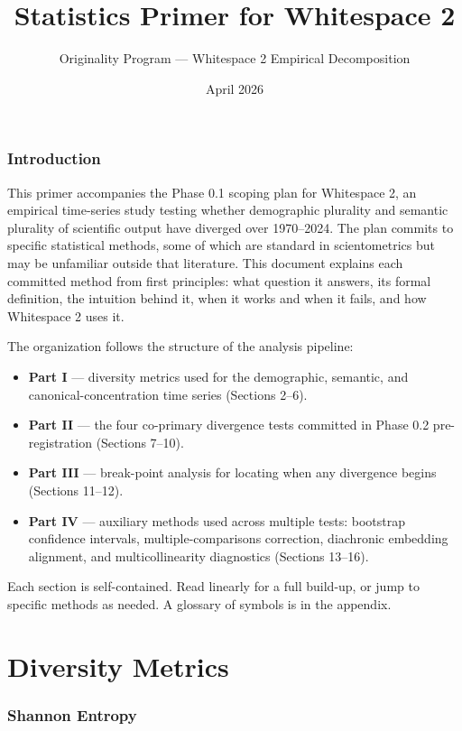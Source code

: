 \documentclass[11pt]{article}
\title{Statistics Primer for Whitespace 2}
\author{Originality Program --- Whitespace 2 Empirical Decomposition}
\date{April 2026}
\begin{document}
\maketitle
\tableofcontents
\clearpage

\section{Introduction}

This primer accompanies the Phase 0.1 scoping plan for Whitespace 2, an
empirical time-series study testing whether demographic plurality and
semantic plurality of scientific output have diverged over 1970--2024.
The plan commits to specific statistical methods, some of which are
standard in scientometrics but may be unfamiliar outside that literature.
This document explains each committed method from first principles:
what question it answers, its formal definition, the intuition behind
it, when it works and when it fails, and how Whitespace 2 uses it.

The organization follows the structure of the analysis pipeline:

\begin{itemize}[nosep]
  \item \textbf{Part I} --- diversity metrics used for the demographic,
    semantic, and canonical-concentration time series (Sections 2--6).
  \item \textbf{Part II} --- the four co-primary divergence tests
    committed in Phase 0.2 pre-registration (Sections 7--10).
  \item \textbf{Part III} --- break-point analysis for locating when any
    divergence begins (Sections 11--12).
  \item \textbf{Part IV} --- auxiliary methods used across multiple tests:
    bootstrap confidence intervals, multiple-comparisons correction,
    diachronic embedding alignment, and multicollinearity diagnostics
    (Sections 13--16).
\end{itemize}

Each section is self-contained. Read linearly for a full build-up, or
jump to specific methods as needed. A glossary of symbols is in the
appendix.

\clearpage
\part{Diversity Metrics}

\section{Shannon Entropy}
\label{sec:shannon}
\end{document}
